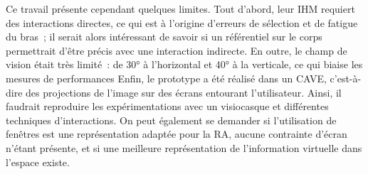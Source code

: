 Ce travail présente cependant quelques limites. Tout d'abord, leur IHM requiert des interactions directes, ce qui est à l'origine d'erreurs de sélection et de fatigue du bras~; il serait alors intéressant de savoir si un référentiel sur le corps permettrait d'être précis avec une interaction indirecte. En outre, le champ de vision était très limité~: de 30° à l'horizontal et 40° à la verticale, ce qui biaise les mesures de performances Enfin, le prototype a été réalisé dans un CAVE, c'est-à-dire des projections de l'image sur des écrans entourant l'utilisateur. Ainsi, il faudrait reproduire les expérimentations avec un visiocasque et différentes techniques d'interactions. On peut également se demander si l'utilisation de fenêtres est une représentation adaptée pour la RA, aucune contrainte d'écran n'étant présente, et si une meilleure représentation de l'information virtuelle dans l'espace existe.


